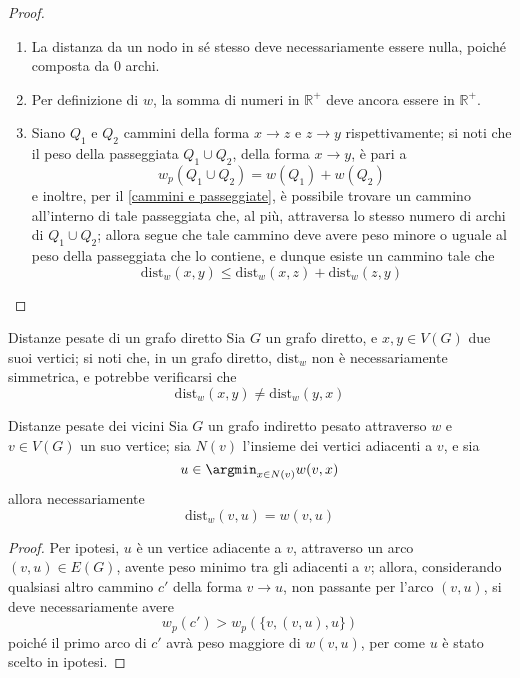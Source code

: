 \documentclass[a4paper, 12pt]{report}
\begin{document}
    \begin{proof}
        \hspace{0.7cm}
        \begin{enumerate}[label=\roman*), font=\itshape]
            \item La distanza da un nodo in sé stesso deve necessariamente essere nulla, poiché composta da 0 archi.
            \item Per definizione di $w$, la somma di numeri in $\mathbb{R}^+$ deve ancora essere in $\mathbb{R}^+$.
            \item Siano $Q_1$ e $Q_2$ cammini della forma $x \rightarrow z$ e $z \rightarrow y$ rispettivamente; si noti che il peso della passeggiata $Q_1 \cup Q_2$, della forma $x \rightarrow y$, è pari a $$w_p(Q_1 \cup Q_2) = w(Q_1) + w(Q_2)$$ e inoltre, per il \cref{cammini e passeggiate}, è possibile trovare un cammino all'interno di tale passeggiata che, al più, attraversa lo stesso numero di archi di $Q_1 \cup Q_2$; allora segue che tale cammino deve avere peso minore o uguale al peso della passeggiata che lo contiene, e dunque esiste un cammino tale che $$\mathrm{dist}_w(x, y) \le \mathrm{dist}_w(x, z) + \mathrm{dist}_w(z, y)$$
        \end{enumerate}
    \end{proof}

    \begin{framedobs}{Distanze pesate di un grafo diretto}
        Sia $G$ un grafo diretto, e $x, y \in V(G)$ due suoi vertici; si noti che, in un grafo diretto, $\mathrm{dist}_w$ non è necessariamente simmetrica, e potrebbe verificarsi che $$\mathrm{dist}_w(x, y) \neq \mathrm{dist}_w(y, x)$$
    \end{framedobs}

    \begin{framedlem}[label={vicini pesati}]{Distanze pesate dei vicini}
        Sia $G$ un grafo indiretto pesato attraverso $w$ e $v \in V(G)$ un suo vertice; sia $N(v)$ l'insieme dei vertici adiacenti a $v$, e sia $$u \in \argmin_{x \in N(v)}{w(v, x)}$$ allora necessariamente $$\mathrm{dist}_w(v, u) = w(v, u)$$
    \end{framedlem}

    \begin{proof}
        Per ipotesi, $u$ è un vertice adiacente a $v$, attraverso un arco $(v, u) \in E(G)$, avente peso minimo tra gli adiacenti a $v$; allora, considerando qualsiasi altro cammino $c'$ della forma $v \rightarrow u$, non passante per l'arco $(v, u)$, si deve necessariamente avere $$w_p(c') > w_p(\{v, (v, u), u\})$$ poiché il primo arco di $c'$ avrà peso maggiore di $w(v, u)$, per come $u$ è stato scelto in ipotesi.
    \end{proof}
\end{document}
